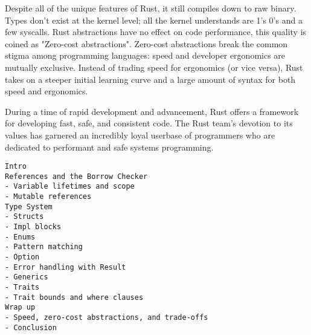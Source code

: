 \documentclass[12pt]{article}
\begin{document}

Despite all of the unique features of Rust, it still compiles down to raw
binary. Types don't exist at the kernel level; all the kernel understands are
1's 0's and a few syscalls. Rust abstractions have no effect on code
performance, this quality is coined as "Zero-cost abstractions". Zero-cost
abstractions break the common stigma among programming languages: speed and
developer ergonomics are mutually exclusive. Instead of trading speed for
ergonomics (or vice versa), Rust takes on a steeper initial learning curve and
a large amount of syntax for both speed and ergonomics.


During a time of rapid development and advancement, Rust offers a framework for
developing fast, safe, and consistent code. The Rust team's devotion to its
values has garnered an incredibly loyal userbase of programmers who are
dedicated to performant and safe systems programming. 

\makeworkscited{}

\begin{verbatim}
Intro
References and the Borrow Checker
- Variable lifetimes and scope
- Mutable references
Type System
- Structs
- Impl blocks
- Enums
- Pattern matching
- Option
- Error handling with Result
- Generics
- Traits
- Trait bounds and where clauses
Wrap up
- Speed, zero-cost abstractions, and trade-offs
- Conclusion
\end{verbatim}
\end{document}
